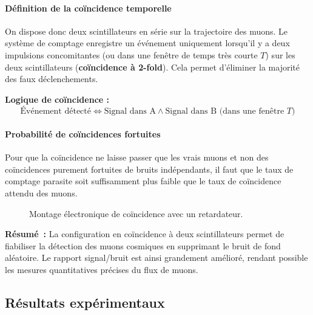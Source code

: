 \documentclass[a4paper,12pt,twoside]{article}
\begin{document}
\paragraph{Définition de la coïncidence temporelle}

On dispose donc deux scintillateurs en série sur la trajectoire des muons. Le système de comptage enregistre un événement uniquement lorsqu’il y a deux impulsions concomitantes (ou dans une fenêtre de temps très courte $T$) sur les deux scintillateurs (\textbf{coïncidence à 2-fold}). Cela permet d’éliminer la majorité des faux déclenchements.

\begin{center}
\begin{tcolorbox}[colback=gray!10!white, colframe=gray!80!black, boxrule=0.5pt, arc=2pt, left=2pt, right=2pt, top=2pt, bottom=2pt]
\textbf{Logique de coïncidence :} 
\[
\text{Événement détecté} \iff \text{Signal dans A} \land \text{Signal dans B} \text{ (dans une fenêtre } T)
\]
\end{tcolorbox}
\end{center}

\paragraph{Probabilité de coïncidences fortuites}

Pour que la coïncidence ne laisse passer que les \og vrais\fg{} muons et non des coïncidences purement fortuites de bruits indépendants, il faut que le taux de comptage parasite soit suffisamment plus faible que le taux de coïncidence attendu des muons.

\begin{figure}[H]
    \centering
    
    \caption{Montage électronique de coïncidence avec un retardateur.}
    \label{fig:coincidence_avec_delais}
\end{figure}
\vspace{1em}
\begin{remarque}
\textbf{Résumé~:} La configuration en coïncidence à deux scintillateurs permet de fiabiliser la détection des muons cosmiques en supprimant le bruit de fond aléatoire. Le rapport signal/bruit est ainsi grandement amélioré, rendant possible les mesures quantitatives précises du flux de muons.
\end{remarque}

\vspace{1em}
\noindent

\subsection{Résultats expérimentaux}
\end{document}
